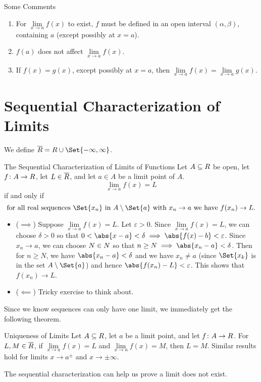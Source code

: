 \begin{Remark}{Some Comments}{}
    \begin{enumerate}[(1)]
        \item For $ \lim\limits_{{x} \to {a}}f(x) $ to exist, $ f $ must be defined in an open interval $ (\alpha,\beta) $, containing
              $ a $ (except possibly at $ x=a $).
        \item $ f(a) $ does not affect $ \lim\limits_{{x} \to {a}}f(x) $.
        \item If $ f(x)=g(x) $, except possibly at $ x=a $, then $ \lim\limits_{{x} \to {a}}f(x)=\lim\limits_{{x} \to {a}}g(x) $.
    \end{enumerate}
\end{Remark}
\section{Sequential Characterization of Limits}
We define $ \ER=R\cup\Set{-\infty,\infty} $.
\begin{Theorem}{The Sequential Characterization of Limits of Functions}{}
    Let $ A\subseteq \relax{R} $ be open, let $ f\colon A\to\relax{R} $, let $ L\in\overline{\relax{R}} $, and let $ a\in A $
    be a limit point of $ A $.
    \[ \lim\limits_{{x} \to {a}}f(x)=L  \]
    if and only if
    \[ \text{for all real sequences $ \Set{x_n} $ in $A\setminus \Set{a}$ with $ x_n\to a $ we have $ f(x_n)\to L $}. \]
    \tcblower{}
    \begin{itemize}
        \item ($ \implies $) Suppose $ \lim\limits_{{x} \to {a}}f(x)=L $. Let $ \varepsilon>0 $.
              Since $ \lim\limits_{{x} \to {a}}f(x)=L $, we can choose $ \delta>0 $ so that $ 0<\abs{x-a}<\delta\implies \abs{f(x)-b}<\varepsilon $.
              Since $ x_n\to a $, we can choose $ N\in\relax{N} $ so that $ n\ge N\implies \abs{x_n-a}<\delta $. Then for $ n\ge N $,
              we have $ \abs{x_n-a}<\delta $ and we have $ x_n\ne a $
              (since $ \Set{x_k} $ is in the set $ A\setminus \Set{a} $) and hence $ \abs{f(x_n)-L}<\varepsilon $. This shows that $ f(x_n)\to L $.
        \item ($ \impliedby $) Tricky exercise to think about.
    \end{itemize}
\end{Theorem}
Since we know sequences can only have one limit, we immediately get the following theorem.
\begin{Theorem}{Uniqueness of Limits}{}
    Let $ A\subseteq\relax{R} $, let $ a $ be a limit point, and let $ f\colon A\to \relax{R} $.
    For $ L,M\in\overline{\relax{R}} $, if $ \lim\limits_{{x} \to {a}}f(x)=L $ and $ \lim\limits_{{x} \to {a}}f(x)=M $, then
    $ L=M $. Similar results hold for limits $ x\to a^{\pm} $ and $ x\to \pm\infty $.
\end{Theorem}
The sequential characterization can help us prove a limit does not exist.
